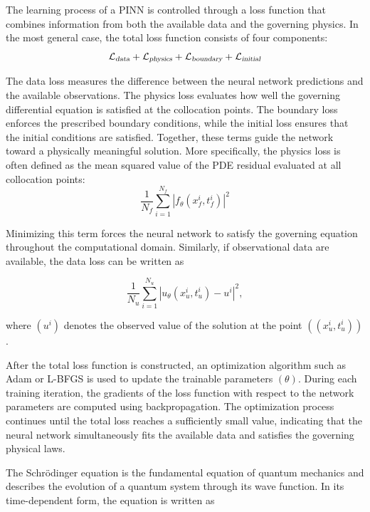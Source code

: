 \documentclass[11pt]{article}
\begin{document}
The learning process of a PINN is controlled through a loss function that combines 
information from both the available data and the governing physics. 
In the most general case, the total loss function consists of four components:
$$
\mathcal{L_{\textsl{data}}}
+
\mathcal{L_{\textsl{physics}}}
+
\mathcal{L_{\textsl{boundary}}}
+
\mathcal{L_{\textsl{initial}}}
$$

The data loss measures the difference between the neural network 
predictions and the available observations. The physics loss 
evaluates how well the governing differential equation is 
satisfied at the collocation points. The boundary loss enforces 
the prescribed boundary conditions, while the initial loss 
ensures that the initial conditions are satisfied. Together, 
these terms guide the network toward a physically meaningful solution.
More specifically, the physics loss is often defined as the mean squared value of 
the PDE residual evaluated at all collocation points:
\begin{equation}
	\frac{1}{N_f}
	\sum_{i=1}^{N_f}
	\left|
	f_\theta(x_f^i,t_f^i)
	\right|^2
\end{equation}


Minimizing this term forces the neural network to satisfy the 
governing equation throughout the computational domain. Similarly, 
if observational data are available, the data loss can be written as


\begin{equation}
	\frac{1}{N_u}
	\sum_{i=1}^{N_u}
	\left|
	u_\theta(x_u^i,t_u^i)-u^i
	\right|^2,
\end{equation}

where $(u^i)$ denotes the observed value of the solution at the point $((x_u^i,t_u^i))$.


After the total loss function is constructed, an optimization algorithm such 
as Adam or L-BFGS is used to update the trainable parameters $(\theta)$. 
During each training iteration, the gradients of the loss function with 
respect to the network parameters are computed using backpropagation. 
The optimization process continues until the total loss reaches a sufficiently 
small value, indicating that the neural network simultaneously fits the available 
data and satisfies the governing physical laws.


The Schrödinger equation is the fundamental equation of quantum mechanics and 
describes the evolution of a quantum system through its wave function. In its 
time-dependent form, the equation is written as
\end{document}
